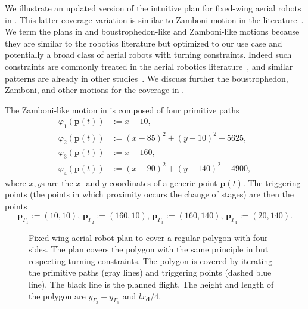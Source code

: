 We illustrate an updated version of the intuitive plan for fixed-wing aerial robots in . This latter coverage variation is similar to Zamboni motion in the literature~\citep{araujo2013multiple}. 
We term the plans in  and  boustrophedon-like and Zamboni-like motions because they are similar to the robotics literature but optimized to our use case and potentially a broad class of aerial robots with turning constraints. Indeed such constraints are commonly treated in the aerial robotics literature~\citep{artemenko2016energy,li2011coverage,xu2011optimal,xu2014efficient}, and similar patterns are already in other studies~\citep{huang2001optimal,xu2014efficient}. We discuss further the boustrophedon, Zamboni, and other motions for the coverage in . 

The Zamboni-like motion in  is composed of four primitive paths
\begin{subequations}\label{eq:basic-plan}\begin{align}
\varphi_1(\mathbf{p}(t))&:=x-10,\label{eq:line1}\\
\varphi_2(\mathbf{p}(t))&:=(x-85)^2+(y-10)^2-5625,\label{eq:circ1}\\
\varphi_3(\mathbf{p}(t))&:=x-160,\label{eq:line2}\\
\varphi_4(\mathbf{p}(t))&:=(x-90)^2+(y-140)^2-4900,\label{eq:circ2}\end{align}
\end{subequations}
where $x,y$s are the $x$- and $y$-coordinates of a generic point $\mathbf{p}(t)$. The triggering points (the points in which proximity occurs the change of stages) are then the points
\begin{equation}\label{eq:basic-plan-trigs}
  \mathbf{p}_{\Gamma_1}:=(10,10),\,\mathbf{p}_{\Gamma_2}:=(160,10),\,\mathbf{p}_{\Gamma_3}:=(160,140),\,\mathbf{p}_{\Gamma_4}:=(20,140).
\end{equation}

\begin{figure}[ht!]
  \centering
  
  \caption[Zamboni-like motion to cover a regular polygon with four sides]{Fixed-wing aerial robot plan to cover a regular polygon with four sides. The plan covers the polygon with the same principle in  but respecting turning constraints. The polygon is covered by iterating the primitive paths (gray lines) and triggering points (dashed blue line). The black line is the planned flight. The height and length of the polygon are $y_{\Gamma_3}-y_{\Gamma_1}$ and $lx_\mathbf{d}/4$.}
  \label{fig:zambo-like_pb}
\end{figure}

